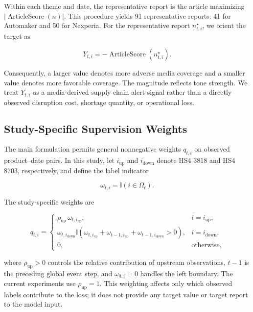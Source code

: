 \documentclass[letterpaper]{article} %
\begin{document}
Within each theme and date, the representative report is the article maximizing \(\left|\operatorname{ArticleScore}(n)\right|\). This procedure yields 91 representative reports: 41 for Automaker and 50 for Nexperia. For the representative report \(n_{t,i}^{\star}\), we orient the target as

\begin{equation}
Y_{t,i}=-\operatorname{ArticleScore}(n_{t,i}^{\star}).
\label{eq:adverse-risk-signal}
\end{equation}

Consequently, a larger value denotes more adverse media coverage and a smaller value denotes more favorable coverage. The magnitude reflects tone strength. We treat \(Y_{t,i}\) as a media-derived supply chain alert signal rather than a directly observed disruption cost, shortage quantity, or operational loss.

\subsection{Study-Specific Supervision Weights}
\label{app:supervision}

The main formulation permits general nonnegative weights \(q_{t,i}\) on observed product--date pairs. In this study, let \(i_{\mathrm{up}}\) and \(i_{\mathrm{down}}\) denote HS4 3818 and HS4 8703, respectively, and define the label indicator

\begin{equation}
\omega_{t,i}=\mathbb{I}(i\in\Omega_t).
\end{equation}

The study-specific weights are

\begin{equation}
q_{t,i}
=
\begin{cases}
\rho_{\mathrm{up}}\,\omega_{t,i_{\mathrm{up}}},
& i=i_{\mathrm{up}},\\[3pt]
\omega_{t,i_{\mathrm{down}}}
\mathbb{I}\!\left(
\omega_{t,i_{\mathrm{up}}}
+\omega_{t-1,i_{\mathrm{up}}}
+\omega_{t-1,i_{\mathrm{down}}}>0
\right),
& i=i_{\mathrm{down}},\\[3pt]
0,
& \text{otherwise},
\end{cases}
\label{eq:study-supervision}
\end{equation}

where \(\rho_{\mathrm{up}}>0\) controls the relative contribution of upstream observations, \(t-1\) is the preceding global event step, and \(\omega_{0,i}=0\) handles the left boundary. The current experiments use \(\rho_{\mathrm{up}}=1\). This weighting affects only which observed labels contribute to the loss; it does not provide any target value or target report to the model input.
\end{document}
